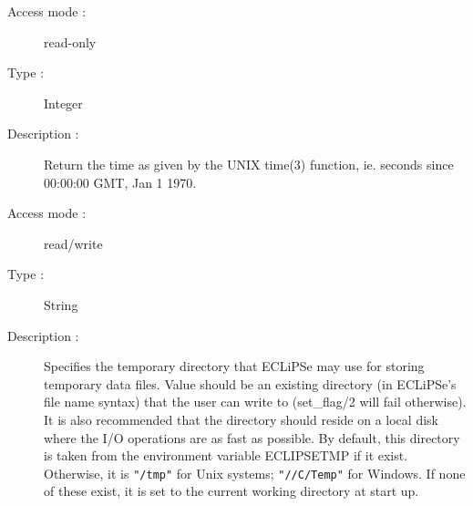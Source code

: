 \begin{description}
\begin{description}
\item[Access mode : ] read-only 
\item[Type : ] Integer
\item[Description : ] Return the time as given by the UNIX time(3) function,
ie. seconds since 00:00:00 GMT, Jan 1 1970.
\end{description}

\begin{description}
\item[Access mode : ] read/write
\item[Type : ] String
\item[Description : ] Specifies the temporary directory that ECLiPSe may use
for storing temporary data files. Value should be an
existing directory (in ECLiPSe's file name syntax) that the user
can write to (set_flag/2 will fail otherwise). It is also
recommended that the directory should reside on a local disk where
the I/O operations are as fast as possible.   By default, this
directory is taken from the environment variable ECLIPSETMP if it
exist. Otherwise, it is {\tt "/tmp"} for Unix systems; {\tt "//C/Temp"} for
Windows. If none of these exist, it is set to the current
working directory at start up.
\end{description}



\end{description}

